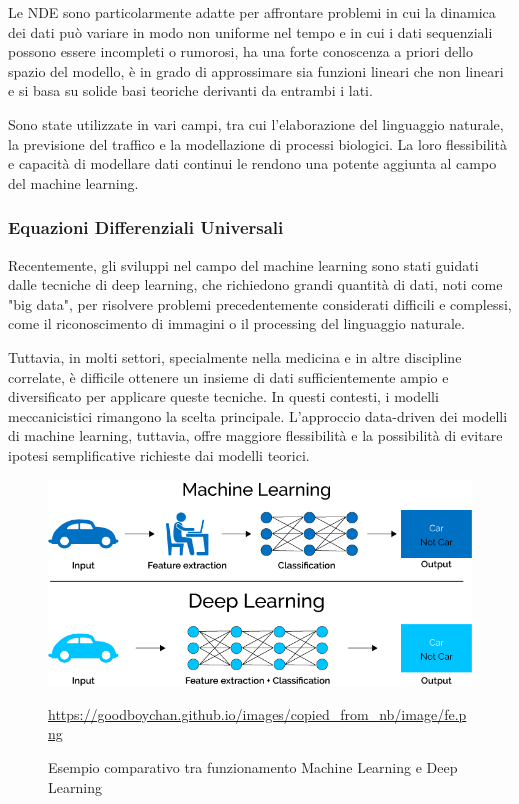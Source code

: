 Le NDE sono particolarmente adatte per affrontare problemi in cui la dinamica dei dati può variare in modo non uniforme nel tempo e in cui i dati sequenziali possono essere incompleti o rumorosi, ha una forte conoscenza a priori 
dello spazio del modello, è in grado di approssimare sia funzioni 
lineari che non lineari e si basa su solide basi teoriche derivanti da 
entrambi i lati. 

Sono state utilizzate in vari campi, tra cui l'elaborazione del linguaggio naturale, la previsione del traffico e la modellazione di processi biologici. La loro flessibilità e capacità di modellare dati continui le rendono una potente aggiunta al campo del machine learning.

\subsubsection{Equazioni Differenziali Universali}

Recentemente, gli sviluppi nel campo del machine learning sono stati 
guidati dalle tecniche di deep learning, che richiedono grandi quantità 
di dati, noti come "big data", per risolvere problemi precedentemente 
considerati difficili e complessi, come il riconoscimento di immagini o 
il processing del linguaggio naturale.

Tuttavia, in molti settori, specialmente nella medicina e in altre 
discipline correlate, è difficile ottenere un insieme di dati 
sufficientemente ampio e diversificato per applicare queste tecniche. 
In questi contesti, i modelli meccanicistici rimangono la scelta 
principale. L'approccio data-driven dei modelli di machine learning, 
tuttavia, offre maggiore flessibilità e la possibilità di evitare 
ipotesi semplificative richieste dai modelli teorici.

\begin{figure}[H]
    \begin{center}
        \includegraphics[scale=0.4]{img/Caratteristiche-e-funzionamento-del-Deep-Learning-in-informatica.png}
        \caption{Esempio comparativo tra funzionamento Machine Learning e Deep Learning}
        \url{https://goodboychan.github.io/images/copied_from_nb/image/fe.png}
        \label{fig:ml_dl_example}
    \end{center}
\end{figure}

